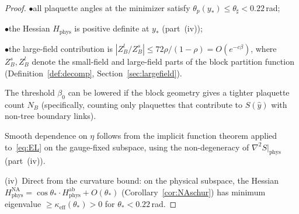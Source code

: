 \documentclass[11pt]{article}
\theoremstyle{definition}
\begin{document}
\begin{proof}
$\bullet$\quad all plaquette angles at the minimizer satisfy
$\theta_p(y_*)\le\theta_\sharp<0.22$\,rad;

$\bullet$\quad the Hessian $H_{\mathrm{phys}}$ is positive
definite at $y_*$ (part~(iv));

$\bullet$\quad the large-field contribution is
$|Z_B^l/Z_B^s|\le 72\rho/(1-\rho)=O(e^{-c\beta})$,
where $Z_B^s,Z_B^l$ denote the small-field and large-field
parts of the block partition function
(Definition~\ref{def:decomp}, Section~\ref{sec:largefield}).

\noindent
The threshold $\beta_0$ can be lowered if the block geometry
gives a tighter plaquette count $N_B$
(specifically, counting only plaquettes that
contribute to $S(\hat{y})$ with non-tree boundary links).

Smooth dependence on $\eta$ follows from the implicit function theorem
applied to~\eqref{eq:EL} on the gauge-fixed subspace, using the
non-degeneracy of $\nabla^2 S|_{\mathrm{phys}}$ (part~(iv)).

(iv)~Direct from the curvature bound: on the physical subspace,
the Hessian $H^{\mathrm{NA}}_{\mathrm{phys}}
=\cos\theta_*\cdot H^{\mathrm{ab}}_{\mathrm{phys}}+O(\theta_*)$
(Corollary~\ref{cor:NAschur}) has minimum eigenvalue
$\ge\kappa_{\mathrm{eff}}(\theta_*)>0$ for $\theta_*<0.22$\,rad.
\end{proof}
\end{document}
